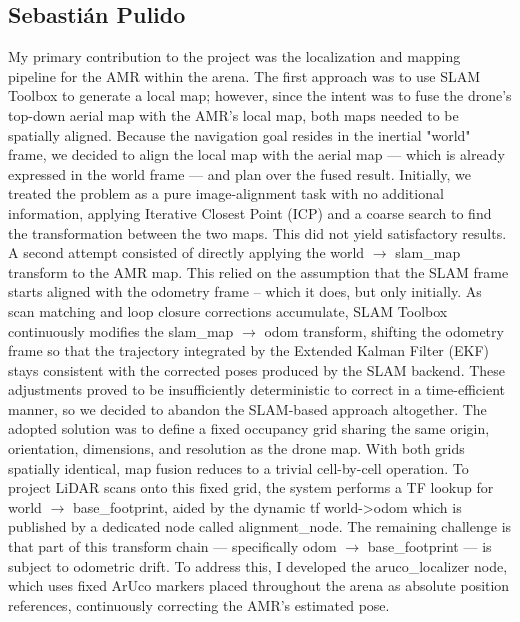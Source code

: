 \documentclass[11pt]{article}
\begin{document}
\subsection*{Sebastián Pulido}
My primary contribution to the project was the localization and mapping pipeline for the AMR within the arena. The first approach was to use SLAM Toolbox to generate a local map; however, since the intent was to fuse the drone's top-down aerial map with the AMR's local map, both maps needed to be spatially aligned. Because the navigation goal resides in the inertial "world" frame, we decided to align the local map with the aerial map — which is already expressed in the world frame — and plan over the fused result.
Initially, we treated the problem as a pure image-alignment task with no additional information, applying Iterative Closest Point (ICP) and a coarse search to find the transformation between the two maps. This did not yield satisfactory results. A second attempt consisted of directly applying the world $\rightarrow$ slam\_map transform to the AMR map. This relied on the assumption that the SLAM frame starts aligned with the odometry frame -- which it does, but only initially. As scan matching and loop closure corrections accumulate, SLAM Toolbox continuously modifies the slam\_map $\rightarrow$ odom transform, shifting the odometry frame so that the trajectory integrated by the Extended Kalman Filter (EKF) stays consistent with the corrected poses produced by the SLAM backend. These adjustments proved to be insufficiently deterministic to correct in a time-efficient manner, so we decided to abandon the SLAM-based approach altogether.
The adopted solution was to define a fixed occupancy grid sharing the same origin, orientation, dimensions, and resolution as the drone map. With both grids spatially identical, map fusion reduces to a trivial cell-by-cell operation. To project LiDAR scans onto this fixed grid, the system performs a TF lookup for world $\rightarrow$ base\_footprint, aided by the dynamic tf world->odom which is published by a dedicated node called alignment\_node. The remaining challenge is that part of this transform chain — specifically odom $\rightarrow$ base\_footprint — is subject to odometric drift. To address this, I developed the aruco\_localizer node, which uses fixed ArUco markers placed throughout the arena as absolute position references, continuously correcting the AMR's estimated pose.
\vspace{4em}
\end{document}
